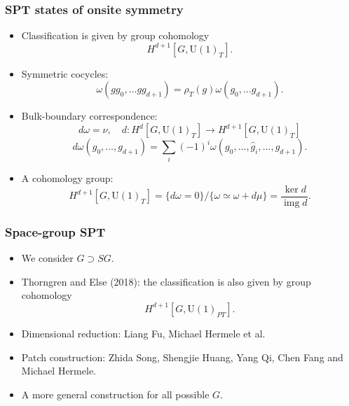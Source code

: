 \documentclass[xcolor=table, 10pt, aspectratio=43]{beamer}
\newcommand{\uone}{\mathrm U(1)}
\DeclareMathOperator{\img}{img}
\begin{document}
\begin{frame}
  \frametitle{SPT states of onsite symmetry}
  \begin{itemize}
    \item Classification is given by group cohomology
    \[H^{d+1}[G, \uone_T].\]
		\item Symmetric cocycles:
		\[\omega(gg_0,\ldots gg_{d+1})=\rho_T(g)\omega(g_0,\ldots g_{d+1}).\]
		\item Bulk-boundary correspondence:
		\[d\omega = \nu,\quad d:H^d[G, \uone_T]\rightarrow H^{d+1}[G, \uone_T]\]
		\[d\omega(g_0,\ldots,g_{d+1})
		=\sum_i(-1)^i\omega(g_0,\ldots,\hat g_i,\ldots,g_{d+1}).\]
\begin{center}
\end{center}
  \item A cohomology group:
\[H^{d+1}[G,\uone_T]=\{d\omega=0\}/\{\omega\simeq\omega+d\mu\}=\frac{\ker d}{\img d}.\]
  \end{itemize}
\end{frame}

\begin{frame}
\frametitle{Space-group SPT}
\begin{itemize}
\item We consider $G\supset SG$.
\item Thorngren and Else (2018): the classification is also given by group cohomology
\[H^{d+1}[G, \uone_{PT}].\]
\item Dimensional reduction: Liang Fu, Michael Hermele et al.
\item Patch construction: Zhida Song, Shengjie Huang, Yang Qi, Chen Fang and Michael Hermele.
\item A more general construction for all possible $G$.
\end{itemize}
\end{frame}
\end{document}
